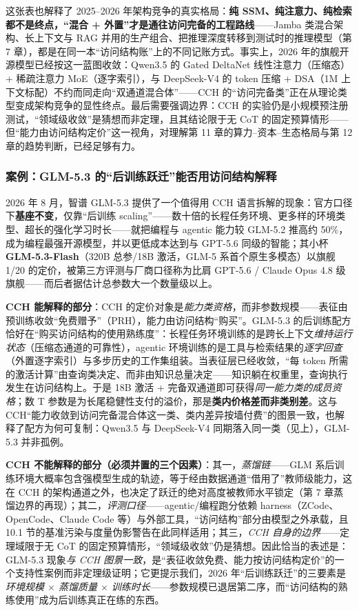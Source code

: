 \documentclass[12pt,a4paper]{article}
\begin{document}
这张表也解释了 2025--2026 年架构竞争的真实格局：\textbf{纯 SSM、纯注意力、纯检索都不是终点，“混合 + 外置”才是通往访问完备的工程路线}——Jamba 类混合架构、长上下文与 RAG 并用的生产组合、把推理深度转移到测试时的推理模型（第 7 章），都是在同一本“访问结构账”上的不同记账方式。事实上，2026 年的旗舰开源模型已经按这一蓝图收敛：Qwen3.5 的 Gated DeltaNet 线性注意力（压缩态）+ 稀疏注意力 MoE（逐字索引），与 DeepSeek-V4 的 token 压缩 + DSA（1M 上下文标配）不约而同走向“双通道混合体”——CCH 的“访问完备类”正在从理论类型变成架构竞争的显性终点。最后需要强调边界：CCH 的实验仍是小规模预注册测试，“领域级收敛”是猜想而非定理，且其结论限于无 CoT 的固定预算情形——但“能力由访问结构定价”这一视角，对理解第 11 章的算力--资本--生态格局与第 12 章的趋势判断，已经足够有力。

\subsubsection{案例：GLM-5.3 的“后训练跃迁”能否用访问结构解释}

2026 年 8 月，智谱 GLM-5.3 提供了一个值得用 CCH 语言拆解的现象：官方口径下\textbf{基座不变}，仅靠“后训练 scaling”——数十倍的长程任务环境、更多样的环境类型、超长的强化学习时长——就把编程与 agentic 能力较 GLM-5.2 推高约 50\%，成为编程最强开源模型，并以更低成本达到与 GPT-5.6 同级的智能；其小杯 \textbf{GLM-5.3-Flash}（320B 总参/18B 激活，GLM-5 系首个原生多模态）以旗舰 1/20 的定价，被第三方评测与厂商口径称为比肩 GPT-5.6 / Claude Opus 4.8 级旗舰——而后者据估计总参数大一个数量级以上。

\textbf{CCH 能解释的部分}：CCH 的定价对象是\emph{能力类资格}，而非参数规模——表征由预训练收敛“免费赠予”（PRH），能力由访问结构“购买”。GLM-5.3 的后训练配方恰好在“购买访问结构的使用熟练度”：长程任务环境训练的是跨长上下文\emph{维持运行状态}（压缩态通道的可靠性），agentic 环境训练的是工具与检索结果的\emph{逐字回查}（外置逐字索引）与多步历史的工作集组装。当表征层已经收敛，“每 token 所需的激活计算”由查询类决定、而非由知识总量决定——知识躺在权重里，查询执行发生在访问结构上。于是 18B 激活 + 完备双通道即可获得\emph{同一能力类的成员资格}；数 T 参数是为长尾稳健性支付的溢价，那是\textbf{类内价格差而非类别差}。这与 CCH“能力收敛到访问完备混合体这一类、类内差异按墙付费”的图景一致，也解释了配方为何可复制：Qwen3.5 与 DeepSeek-V4 同期落入同一类（见上），GLM-5.3 并非孤例。

\textbf{CCH 不能解释的部分（必须并置的三个因素）}：其一，\emph{蒸馏链}——GLM 系后训练环境大概率包含强模型生成的轨迹，等于经由数据通道“借用了”教师级能力，这在 CCH 的架构通道之外，也决定了跃迁的绝对高度被教师水平锁定（第 7 章蒸馏边界的再现）；其二，\emph{评测口径}——agentic/编程跑分依赖 harness（ZCode、OpenCode、Claude Code 等）与外部工具，“访问结构”部分由模型之外承载，且 10.1 节的基准污染与度量伪影警告在此同样适用；其三，\emph{CCH 自身的边界}——定理域限于无 CoT 的固定预算情形，“领域级收敛”仍是猜想。因此恰当的表述是：GLM-5.3 现象\emph{与 CCH 图景一致}，是“表征收敛免费、能力按访问结构定价”的一个支持性案例而非定理级证明；它更提示我们，2026 年“后训练跃迁”的三要素是\emph{环境规模 $\times$ 蒸馏质量 $\times$ 训练时长}——参数规模已退居第二序，而“访问结构的熟练使用”成为后训练真正在练的东西。
\end{document}
